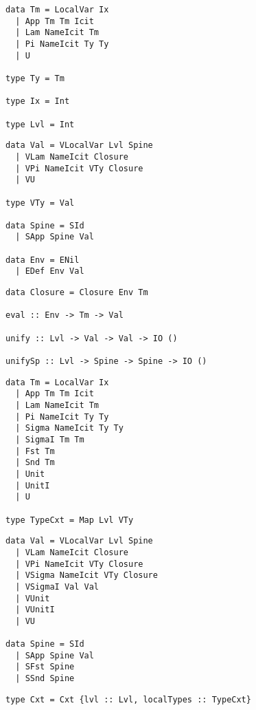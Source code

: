 \begin{figure*}
\small
\begin{minipage}[t]{.45\textwidth}
\begin{minipage}[t]{.40\textwidth}
\begin{lstlisting}
data Tm = LocalVar Ix
  | App Tm Tm Icit
  | Lam NameIcit Tm
  | Pi NameIcit Ty Ty
  | U

type Ty = Tm

type Ix = Int

type Lvl = Int
\end{lstlisting}
\end{minipage}
\begin{minipage}[t]{.59\textwidth}
\begin{lstlisting}
data Val = VLocalVar Lvl Spine
  | VLam NameIcit Closure
  | VPi NameIcit VTy Closure
  | VU

type VTy = Val

data Spine = SId
  | SApp Spine Val

data Env = ENil
  | EDef Env Val
\end{lstlisting}
\end{minipage}
\begin{lstlisting}
data Closure = Closure Env Tm

eval :: Env -> Tm -> Val

unify :: Lvl -> Val -> Val -> IO ()

unifySp :: Lvl -> Spine -> Spine -> IO ()
\end{lstlisting}
\end{minipage}
\begin{minipage}[t]{.54\textwidth}
\begin{leftbar}
\begin{minipage}[t]{.49\textwidth}
\begin{lstlisting}
data Tm = LocalVar Ix
  | App Tm Tm Icit
  | Lam NameIcit Tm
  | Pi NameIcit Ty Ty
  | Sigma NameIcit Ty Ty
  | SigmaI Tm Tm
  | Fst Tm
  | Snd Tm
  | Unit
  | UnitI
  | U

type TypeCxt = Map Lvl VTy
\end{lstlisting}
\end{minipage}
\begin{minipage}[t]{.49\textwidth}
\begin{lstlisting}
data Val = VLocalVar Lvl Spine
  | VLam NameIcit Closure
  | VPi NameIcit VTy Closure
  | VSigma NameIcit VTy Closure
  | VSigmaI Val Val
  | VUnit
  | VUnitI
  | VU

data Spine = SId
  | SApp Spine Val
  | SFst Spine
  | SSnd Spine
\end{lstlisting}
\end{minipage}
\begin{lstlisting}
type Cxt = Cxt {lvl :: Lvl, localTypes :: TypeCxt}


\end{lstlisting}
\end{leftbar}
\end{minipage}
\end{figure*}
